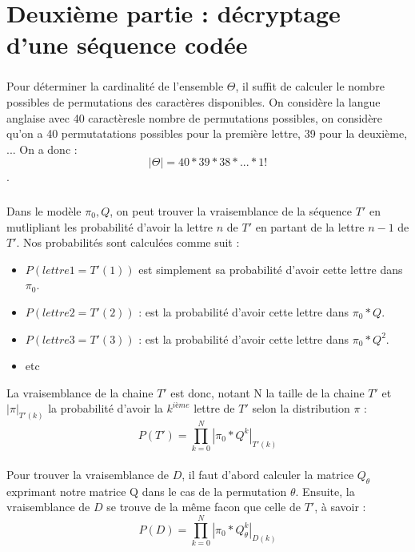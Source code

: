 \documentclass[11pt]{report}
\begin{document}
\section{Deuxième partie : décryptage d’une séquence codée}
\subsubsection{}
Pour déterminer la cardinalité de l'ensemble $\Theta$, il suffit de calculer le nombre possibles de permutations des caractères disponibles. On considère la langue anglaise avec 40 caractèresle nombre de permutations possibles, on considère qu'on a 40 permutatations possibles pour la première lettre, 39 pour la deuxième, ... On a donc : 
$$|\Theta| = 40 * 39 *38 * ... * 1!$$. 
\subsubsection{}
\paragraph{}
Dans le modèle $\pi_0, Q$, on peut trouver la vraisemblance de la séquence $T'$ en mutlipliant les probabilité d'avoir la lettre $n$ de $T'$ en partant de la lettre $n-1$ de $T'$. Nos probabilités sont calculées comme suit : 

\begin{itemize}
\item $P(lettre 1 = T'(1))$ est simplement sa probabilité d'avoir cette lettre dans $\pi_{0}$.
\item $P(lettre 2 = T'(2))$ : est la probabilité d'avoir cette lettre dans $\pi_{0}*Q$.
\item $P(lettre 3 = T'(3))$ : est la probabilité d'avoir cette lettre dans $\pi_{0}*Q^{2}$.
\item etc
\end{itemize}

La vraisemblance de la chaine $T'$ est donc, notant N la taille de la chaine $T'$ et $| \pi|_{T'(k)}$ la probabilité d'avoir la $k^{ième}$ lettre de $T'$ selon la distribution $\pi$ :
$$P(T') = \prod_{k=0}^{N} |\pi_{0}*Q^{k}|_{T'(k)}$$

\paragraph{}
Pour trouver la vraisemblance de $D$, il faut d'abord calculer la matrice $Q_{\theta}$ exprimant notre matrice Q dans le cas  de la permutation $\theta$. Ensuite, la vraisemblance de $D$ se trouve de la même facon que celle de $T'$, à savoir : 
$$P(D) = \prod_{k=0}^{N} |\pi_{0}*Q_{\theta}^{k}|_{D(k)}$$
\end{document}
